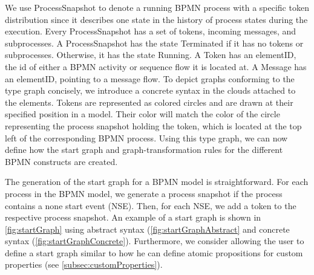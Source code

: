 \documentclass[submission, copyright, creativecommons]{eptcs}
\begin{document}
We use \textsf{ProcessSnapshot} to denote a running BPMN process with a specific token distribution since it describes one state in the history of process states during the execution.
Every \textsf{ProcessSnapshot} has a set of \textsf{tokens}, incoming \textsf{messages}, and \textsf{subprocesses}.
A \textsf{ProcessSnapshot} has the state \textsf{Terminated} if it has no \textsf{tokens} or \textsf{subprocesses}.
Otherwise, it has the state \textsf{Running}.
A \textsf{Token} has an \textsf{elementID}, the id of either a BPMN activity or sequence flow it is located at.
A \textsf{Message} has an \textsf{elementID}, pointing to a message flow.
To depict graphs conforming to the type graph concisely, we introduce a concrete syntax in the clouds attached to the elements.
Tokens are represented as colored circles and are drawn at their specified position in a model.
Their color will match the color of the circle representing the process snapshot holding the token, which is located at the top left of the corresponding BPMN process.
Using this type graph, we can now define how the start graph and graph-transformation rules for the different BPMN constructs are created.

The generation of the start graph for a BPMN model is straightforward.
For each process in the BPMN model, we generate a process snapshot if the process contains a none start event (NSE).
Then, for each NSE, we add a token to the respective process snapshot.
An example of a start graph is shown in \cref{fig:startGraph} using abstract syntax (\cref{fig:startGraphAbstract} and concrete syntax (\cref{fig:startGraphConcrete}).
Furthermore, we consider allowing the user to define a start graph similar to how he can define atomic propositions for custom properties (see \cref{subsec:customProperties}).
\end{document}
